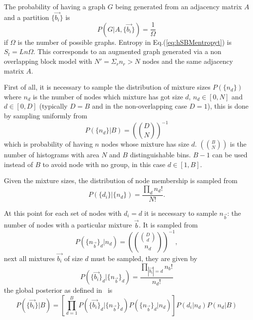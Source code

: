 The probability of having a graph $G$ being generated from an adjacency matrix $A$ and a partition $\{\vec{b_i}\}$ is \[P(G|A,\{\vec{b_i}\})=\frac{1}{\Omega}\]
if $\Omega$ is the number of possible graphs. Entropy in Eq.(\ref{eq:hSBMentropyt}) is $S_t=Ln\Omega$. This corresponds to an augmented graph generated via a
non overlapping block model with $N'=\Sigma_r n_r>N$ nodes and the same adjacency matrix $A$.

First of all, it is necessary to sample the distribution of mixture sizes $P(\{n_d\})$ where $n_d$ is the number of nodes which mixture has got size $d$, $n_d\in[0,N]$ and $d\in[0,D]$ (typically $D=B$ and in the non-overlapping case $D=1$), this is done by sampling uniformly from \[P(\{n_d\}|B)=\left(\binom{D}{N}\right)^{-1}\] which is probability of having $n$ nodes whose mixture has size $d$. $\left(\binom{B}{N}\right)$ is the number of histograms with area $N$ and $B$ distinguishable bins. $B-1$ can be used instead of $B$ to avoid node with no group, in this case $d\in[1,B]$.

Given the mixture sizes, the distribution of node membership is sampled from \[P(\{d_i\}|\{n_d\})=\frac{\prod_{d} n_d!}{N!}.\]

At this point for each set of nodes with $d_i=d$ it is necessary to sample $n_{\vec{b}}$: the number of nodes with a particular mixture $\vec{b}$. It is sampled from
\begin{equation}
  P(\{n_{\vec{b}}\}_d|n_d)=\left(\binom{\binom{D}{d}}{n_d}\right)^{-1},
\end{equation}
next all mixtures $\vec{b_i}$ of size $d$ must be sampled, they are given by
\begin{equation}
  P(\{\vec{b_i}\}_d|\{n_{\vec{b}}\}_d)=\frac{\prod_{|\vec{b_i}|=d} n_b!}{n_d!}
\end{equation}
the global posterior as defined in~\cite{peixoto2015model} is
\begin{equation}
  P(\{\vec{b_i}\}|B)=\left[\prod_{d=1}^B  P(\{\vec{b_i}\}_d|\{n_{\vec{b}}\}_d) P(\{n_{\vec{b}}\}_d|n_d)\right]P({d_i}|{n_d})P(n_d|B)
\end{equation}

